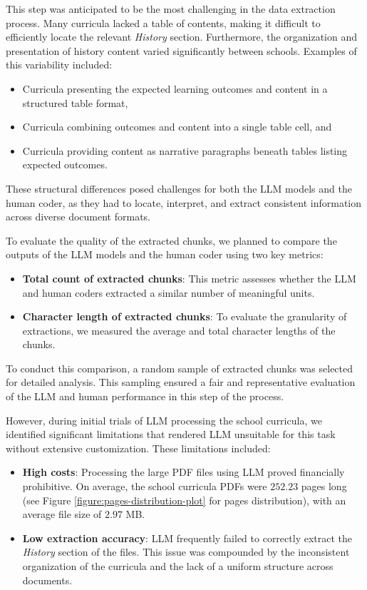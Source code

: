 \documentclass[]{interact}
\theoremstyle{plain}%
\theoremstyle{definition}
\theoremstyle{remark}
\begin{document}
This step was anticipated to be the most challenging in the data extraction process. Many curricula lacked a table of contents, making it difficult to efficiently locate the relevant \textit{History} section. Furthermore, the organization and presentation of history content varied significantly between schools. Examples of this variability included:  
\begin{itemize}
    \item Curricula presenting the expected learning outcomes and content in a structured table format,  
    \item Curricula combining outcomes and content into a single table cell, and  
    \item Curricula providing content as narrative paragraphs beneath tables listing expected outcomes.  
\end{itemize}

These structural differences posed challenges for both the LLM models and the human coder, as they had to locate, interpret, and extract consistent information across diverse document formats.  

To evaluate the quality of the extracted chunks, we planned to compare the outputs of the LLM models and the human coder using two key metrics:  
\begin{itemize}
    \item \textbf{Total count of extracted chunks}: This metric assesses whether the LLM and human coders extracted a similar number of meaningful units.
    \item \textbf{Character length of extracted chunks}: To evaluate the granularity of extractions, we measured the average and total character lengths of the chunks.
\end{itemize}

To conduct this comparison, a random sample of extracted chunks was selected for detailed analysis. This sampling ensured a fair and representative evaluation of the LLM and human performance in this step of the process.

However, during initial trials of LLM processing the school curricula, we identified significant limitations that rendered LLM unsuitable for this task without extensive customization. These limitations included:  
\begin{itemize}
    \item \textbf{High costs}: Processing the large PDF files using LLM proved financially prohibitive. On average, the school curricula PDFs were $252.23$ pages long (see Figure \ref{figure:pages-distribution-plot} for pages distribution), with an average file size of $2.97$ MB.  
    \item \textbf{Low extraction accuracy}: LLM frequently failed to correctly extract the \textit{History} section of the files. This issue was compounded by the inconsistent organization of the curricula and the lack of a uniform structure across documents.  
\end{itemize}
\end{document}
